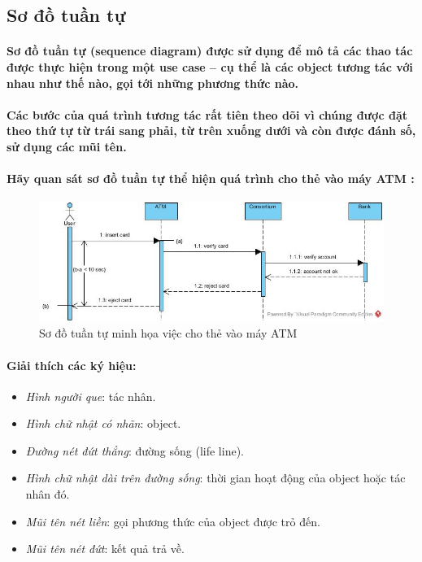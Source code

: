 \documentclass{article}
\begin{document}
  \subsection{Sơ đồ tuần tự}

  \paragraph{\textnormal{Sơ đồ tuần tự (sequence diagram) được sử dụng để mô tả các thao tác được thực hiện trong một use case -- cụ thể là các object tương tác với nhau như thế nào, gọi tới những phương thức nào.}}

  \paragraph{\textnormal{Các bước của quá trình tương tác rất tiên theo dõi vì chúng được đặt theo thứ tự từ trái sang phải, từ trên xuống dưới và còn được đánh số, sử dụng các mũi tên.}}

  \paragraph{\textnormal{Hãy quan sát sơ đồ tuần tự thể hiện quá trình cho thẻ vào máy ATM :}}

  \begin{figure}[!ht]
    \centering
    \includegraphics[scale=0.5]{../pictures/diagrams/sequence/sequence-diagram-1.jpg}
    \caption{Sơ đồ tuần tự minh họa việc cho thẻ vào máy ATM}
  \end{figure}

  \paragraph{\textnormal{Giải thích các ký hiệu:}}
  
  \begin{itemize}
    \item \textit{Hình người que}: tác nhân.
    \item \textit{Hình chữ nhật có nhãn}: object.
    \item \textit{Đường nét đứt thẳng}: đường sống (life line).
    \item \textit{Hình chữ nhật dài trên đường sống}: thời gian hoạt động của object hoặc tác nhân đó.
    \item \textit{Mũi tên nét liền}: gọi phương thức của object được trỏ đến.
    \item \textit{Mũi tên nét đứt}: kết quả trả về.
  \end{itemize}
\end{document}
